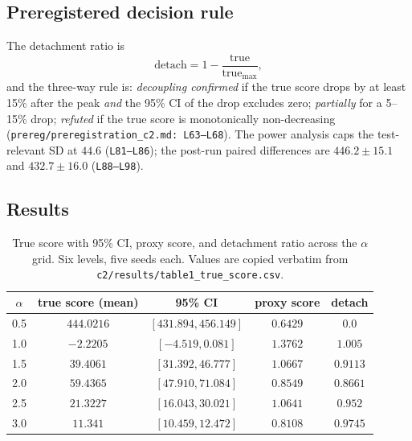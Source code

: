 \documentclass[11pt]{article}
\begin{document}
\subsection{Preregistered decision rule}

The detachment ratio is
\begin{equation}
\mathrm{detach} = 1 - \frac{\mathrm{true}}{\mathrm{true}_{\max}},
\end{equation}
and the three-way rule is: \emph{decoupling confirmed} if the true score drops
by at least 15\% after the peak \emph{and} the 95\% CI of the drop excludes
zero; \emph{partially} for a 5--15\% drop; \emph{refuted} if the true score is
monotonically non-decreasing (\texttt{prereg/preregistration\_c2.md:\,L63--L68}).
The power analysis caps the test-relevant SD at $44.6$
(\texttt{L81--L86}); the post-run paired differences are
$446.2 \pm 15.1$ and $432.7 \pm 16.0$ (\texttt{L88--L98}).

\subsection{Results}

\begin{table}[t]
\centering
\caption{True score with 95\% CI, proxy score, and detachment ratio across the
$\alpha$ grid. Six levels, five seeds each. Values are copied verbatim from
\texttt{c2/results/table1\_true\_score.csv}.}
\label{tab:c2}
\begin{tabular}{ccccc}
\toprule
$\alpha$ & true score (mean) & 95\% CI & proxy score & detach \\
\midrule
0.5 & $444.0216$ & $[431.894, 456.149]$ & $0.6429$ & $0.0$ \\
1.0 & $-2.2205$  & $[-4.519, 0.081]$     & $1.3762$ & $1.005$ \\
1.5 & $39.4061$  & $[31.392, 46.777]$    & $1.0667$ & $0.9113$ \\
2.0 & $59.4365$  & $[47.910, 71.084]$    & $0.8549$ & $0.8661$ \\
2.5 & $21.3227$  & $[16.043, 30.021]$    & $1.0641$ & $0.952$ \\
3.0 & $11.341$   & $[10.459, 12.472]$    & $0.8108$ & $0.9745$ \\
\bottomrule
\end{tabular}
\end{table}
\end{document}
